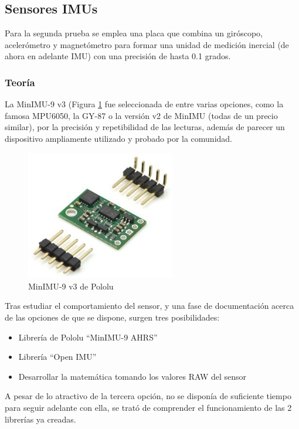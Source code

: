 
\subsection{Sensores IMUs}
Para la segunda prueba se emplea una placa que combina un giróscopo, acelerómetro y magnetómetro para formar una unidad de medición inercial (de ahora en adelante IMU) con una precisión de hasta 0.1 grados.

\subsubsection{Teoría}

La MinIMU-9 v3 (Figura \ref{fig:MinIMU_board} fue seleccionada de entre varias opciones, como la famosa MPU6050, la GY-87 o la versión v2 de MinIMU (todas de un precio similar), por la precisión y repetibilidad de las lecturas, además de parecer un dispositivo ampliamente utilizado y probado por la comunidad.

\begin{figure}
\centering
\includegraphics[width=65mm]{Figures/MinIMU_board}
\caption[MinIMU-9 v3 de Pololu]{MinIMU-9 v3 de Pololu}
\label{fig:MinIMU_board}
\end{figure}

Tras estudiar el comportamiento del sensor, y una fase de documentación acerca de las opciones de que se dispone, surgen tres posibilidades:

\begin{itemize}
  \item Librería de Pololu ``MinIMU-9 AHRS''
  \item Librería ``Open IMU''
  \item Desarrollar la matemática tomando los valores RAW del sensor
\end{itemize}

A pesar de lo atractivo de la tercera opción, no se disponía de suficiente tiempo para seguir adelante con ella, se trató de comprender el funcionamiento de las 2 librerías ya creadas.

